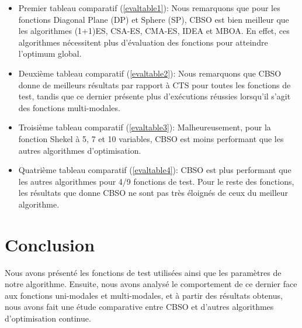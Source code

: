 \begin{itemize}
	\item Premier tableau comparatif (\ref{evaltable1}): Nous remarquons que pour les fonctions Diagonal Plane (DP) et Sphere (SP), CBSO est bien meilleur que les algorithmes (1+1)ES, CSA-ES, CMA-ES, IDEA et MBOA. En effet, ces algorithmes nécessitent plus d'évaluation des fonctions pour atteindre l'optimum global.   
	\item Deuxième tableau comparatif (\ref{evaltable2}): Nous remarquons que CBSO donne de meilleurs résultats par rapport à CTS pour toutes les fonctions de test, tandis que ce dernier présente plus d'exécutions réussies lorsqu'il s'agit des fonctions multi-modales.
	\item Troisième tableau comparatif (\ref{evaltable3}): Malheureusement, pour la fonction Shekel à 5, 7 et 10 variables, CBSO est moins performant que les autres algorithmes d'optimisation.
	\item Quatrième tableau comparatif (\ref{evaltable4}): CBSO est plus performant que les autres algorithmes pour 4/9 fonctions de test. Pour le reste des fonctions, les résultats que donne CBSO ne sont pas très éloignés de ceux du meilleur algorithme. 
 \end{itemize}

\section*{Conclusion}
Nous avons présenté les fonctions de test utilisées ainsi que les paramètres de notre algorithme. Ensuite, nous avons analysé le comportement de ce dernier face aux fonctions uni-modales et multi-modales, et à partir des résultats obtenus, nous avons fait une étude comparative entre CBSO et d'autres algorithmes d'optimisation continue.
